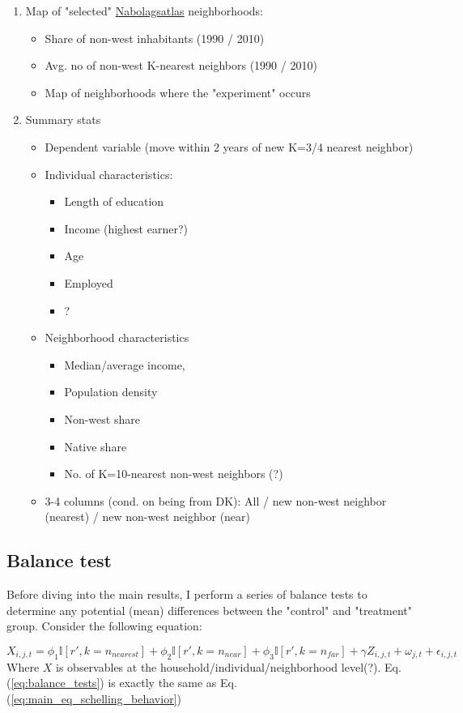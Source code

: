\documentclass[main.tex]{subfiles}
\begin{document}
\begin{enumerate}
    \item Map of "selected" \href{nabolagstlas.dk}{Nabolagsatlas} neighborhoods:
    \begin{itemize}
        \item Share of non-west inhabitants (1990 / 2010)
        \item Avg. no of non-west K-nearest neighbors (1990 / 2010) 
        \item Map of neighborhoods where the "experiment" occurs
    \end{itemize}
    \item Summary stats
    \begin{itemize}
        \item Dependent variable (move within 2 years of new K=3/4 nearest neighbor)
        \item Individual characteristics:
        \begin{itemize}
            \item Length of education
            \item Income (highest earner?)
            \item Age
            \item Employed
            \item ?
        \end{itemize}
        \item Neighborhood characteristics
        \begin{itemize}
            \item Median/average income,
            \item Population density
            \item Non-west share
            \item Native share
            \item No. of K=10-nearest non-west neighbors (?)
        \end{itemize}
        \item 3-4 columns (cond. on being from DK): All / new non-west neighbor (nearest) / new non-west neighbor (near)
    \end{itemize}
\end{enumerate}

\subsection{Balance test}

Before diving into the main results, I perform a series of balance tests to determine any potential (mean) differences between the "control" and "treatment" group. Consider the following equation:

\begin{equation}
    X_{i, j, t} = \phi_1 \mathbb{I}[r', k=n_{nearest}] + \phi_2 \mathbb{I}[r', k = n_{near}] + \phi_3 \mathbb{I}[r', k = n_{far}] + \gamma Z_{i, j, t} + \omega_{j, t} + \epsilon_{i, j, t} 
    \label{eq:balance_tests}
\end{equation}
Where $X$ is observables at the household/individual/neighborhood level(?). Eq. (\ref{eq:balance_tests}) is exactly the same as Eq. (\ref{eq:main_eq_schelling_behavior})
\end{document}
